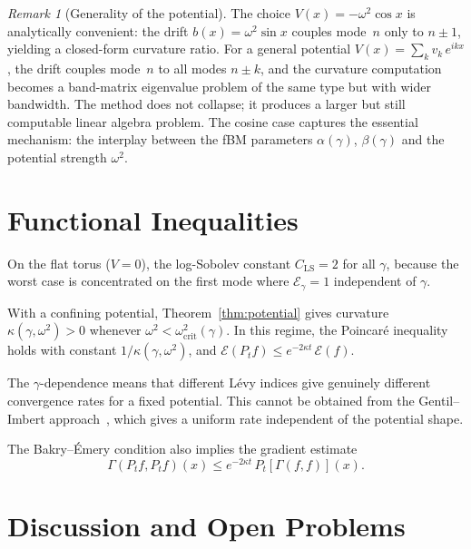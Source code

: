 \documentclass[11pt,a4paper]{article}
\theoremstyle{plain}
\theoremstyle{definition}
\theoremstyle{remark}
\newtheorem{remark}[theorem]{Remark}
\begin{document}
\begin{remark}[Generality of the potential]\label{rem:potential-general}
The choice $V(x) = -\omega^2\cos x$ is analytically convenient:
the drift $b(x) = \omega^2\sin x$ couples mode~$n$ only to
$n \pm 1$, yielding a closed-form curvature ratio.
For a general potential $V(x) = \sum_k v_k\,e^{ikx}$, the drift
couples mode~$n$ to all modes $n \pm k$, and the curvature
computation becomes a band-matrix eigenvalue problem of the same
type but with wider bandwidth. The method does not collapse;
it produces a larger but still computable linear algebra problem.
The cosine case captures the essential mechanism: the interplay
between the fBM parameters $\alpha(\gamma)$, $\beta(\gamma)$ and
the potential strength $\omega^2$.
\end{remark}


\section{Functional Inequalities}\label{sec:func-ineq}

On the flat torus ($V = 0$), the log-Sobolev constant
$C_{\mathrm{LS}} = 2$ for all $\gamma$, because the worst case
is concentrated on the first mode where
$\mathcal{E}_\gamma = 1$ independent of $\gamma$.

With a confining potential, Theorem~\ref{thm:potential} gives
curvature $\kappa(\gamma,\omega^2) > 0$ whenever
$\omega^2 < \omega^2_{\mathrm{crit}}(\gamma)$.
In this regime, the Poincar\'e inequality holds with constant
$1/\kappa(\gamma,\omega^2)$, and
$\mathcal{E}(P_t f) \leq e^{-2\kappa t}\,\mathcal{E}(f)$.

The $\gamma$-dependence means that different L\'evy indices give
genuinely different convergence rates for a fixed potential.
This cannot be obtained from the
Gentil--Imbert approach~\cite{GentilImbert2008}, which gives
a uniform rate independent of the potential shape.

The Bakry--\'Emery condition also implies the gradient estimate
\begin{equation}\label{eq:grad-est}
  \Gamma(P_t f, P_t f)(x) \leq e^{-2\kappa t}\,P_t[\Gamma(f,f)](x).
\end{equation}


\section{Discussion and Open Problems}\label{sec:discussion}
\end{document}
